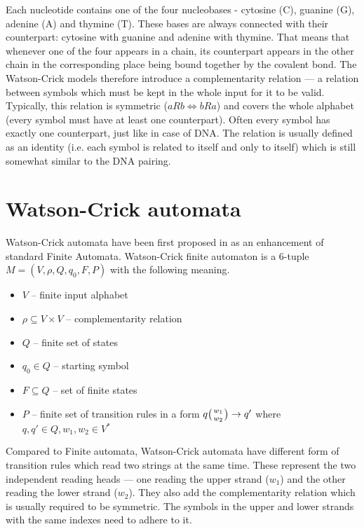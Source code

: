 Each nucleotide contains one of the four nucleobases - cytosine (C), guanine (G), adenine (A) and thymine (T). These bases are always connected with their counterpart: cytosine with guanine and adenine with thymine. That means that whenever one of the four appears in a chain, its counterpart appears in the other chain in the corresponding place being bound together by the covalent bond. The Watson-Crick models therefore introduce a complementarity relation --- a relation between symbols which must be kept in the whole input for it to be valid. Typically, this relation is symmetric ($a R b \Leftrightarrow b R a$) and covers the whole alphabet (every symbol must have at least one counterpart). Often every symbol has exactly one counterpart, just like in case of DNA. The relation is usually defined as an identity (i.e. each symbol is related to itself and only to itself) which is still somewhat similar to the DNA pairing.


\section{Watson-Crick automata}
Watson-Crick automata have been first proposed in \cite{WK_FIN_AUT} as an enhancement of standard Finite Automata. Watson-Crick finite automaton is a 6-tuple $M = (V, \rho, Q, q_0, F, P)$ with the following meaning.
\begin{itemize}
  \item{$V$ -- finite input alphabet}
  \item{$\rho \subseteq V \times V$ -- complementarity relation}
  \item{$Q$ -- finite set of states}
  \item{$q_0 \in Q$ -- starting symbol}
  \item{$F \subseteq Q$ -- set of finite states}
  \item{$P$ -- finite set of transition rules in a form $q \wkpair{w_1}{w_2} \rightarrow q'$ where $q, q' \in Q, w_1, w_2 \in V^*$}
\end{itemize}

Compared to Finite automata, Watson-Crick automata have different form of transition rules which read two strings at the same time. These represent the two independent reading heads --- one reading the upper strand ($w_1$) and the other reading the lower strand ($w_2$). They also add the complementarity relation which is usually required to be symmetric. The symbols in the upper and lower strands with the same indexes need to adhere to it.

